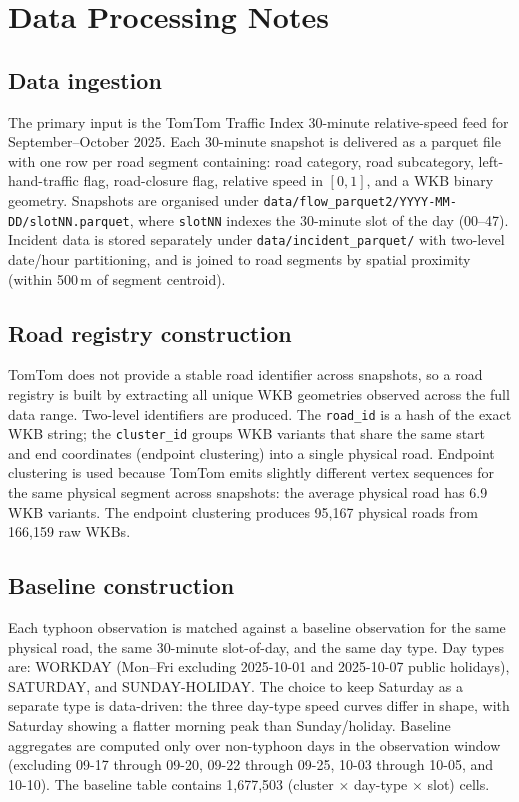 \documentclass[12pt,a4paper]{report}
\begin{document}
\chapter{Data Processing Notes}

\section{Data ingestion}
The primary input is the TomTom Traffic Index 30-minute relative-speed feed for September--October 2025. Each 30-minute snapshot is delivered as a parquet file with one row per road segment containing: road category, road subcategory, left-hand-traffic flag, road-closure flag, relative speed in $[0,1]$, and a WKB binary geometry. Snapshots are organised under \texttt{data/flow\_parquet2/YYYY-MM-DD/slotNN.parquet}, where \texttt{slotNN} indexes the 30-minute slot of the day (00--47). Incident data is stored separately under \texttt{data/incident\_parquet/} with two-level date/hour partitioning, and is joined to road segments by spatial proximity (within 500\,m of segment centroid).

\section{Road registry construction}
TomTom does not provide a stable road identifier across snapshots, so a road registry is built by extracting all unique WKB geometries observed across the full data range. Two-level identifiers are produced. The \texttt{road\_id} is a hash of the exact WKB string; the \texttt{cluster\_id} groups WKB variants that share the same start and end coordinates (endpoint clustering) into a single physical road. Endpoint clustering is used because TomTom emits slightly different vertex sequences for the same physical segment across snapshots: the average physical road has 6.9 WKB variants. The endpoint clustering produces 95,167 physical roads from 166,159 raw WKBs.

\section{Baseline construction}
Each typhoon observation is matched against a baseline observation for the same physical road, the same 30-minute slot-of-day, and the same day type. Day types are: WORKDAY (Mon--Fri excluding 2025-10-01 and 2025-10-07 public holidays), SATURDAY, and SUNDAY-HOLIDAY. The choice to keep Saturday as a separate type is data-driven: the three day-type speed curves differ in shape, with Saturday showing a flatter morning peak than Sunday/holiday. Baseline aggregates are computed only over non-typhoon days in the observation window (excluding 09-17 through 09-20, 09-22 through 09-25, 10-03 through 10-05, and 10-10). The baseline table contains 1,677,503 (cluster $\times$ day-type $\times$ slot) cells.
\end{document}
